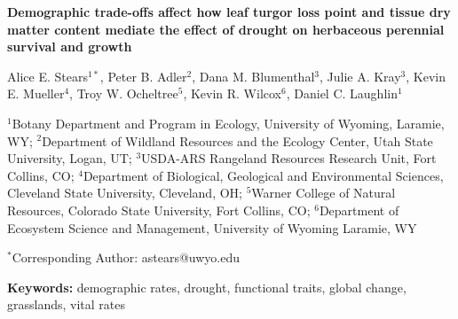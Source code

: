 \documentclass[12pt, letterpaper]{article}
\begin{document}
\begin{flushleft}
\Large{\textbf{Demographic trade-offs affect how leaf turgor loss point and tissue dry matter content mediate the effect of drought on herbaceous perennial survival and growth}} 

\normalsize{Alice E. Stears$^{1*}$, Peter B. Adler$^2$, Dana M. Blumenthal$^3$, Julie A. Kray$^3$, Kevin E. Mueller$^4$, Troy W. Ocheltree$^5$, Kevin R. Wilcox$^6$, Daniel C. Laughlin$^1$}

\small{$^1$Botany Department and Program in Ecology, University of Wyoming, Laramie, WY; \linebreak
$^2$Department of Wildland Resources and the Ecology Center, Utah State University, Logan, UT; \linebreak
$^3$USDA-ARS Rangeland Resources Research Unit, Fort Collins, CO; \linebreak
$^4$Department of Biological, Geological and Environmental Sciences, Cleveland State University, Cleveland, OH; \linebreak
$^5$Warner College of Natural Resources, Colorado State University, Fort Collins, CO; \linebreak
$^6$Department of Ecosystem Science and Management, University of Wyoming Laramie, WY}\linebreak

\small{$^*$Corresponding Author: astears@uwyo.edu}

\end{flushleft}
\textbf{Keywords:} demographic rates, drought, functional traits, global change, grasslands, vital rates
\end{document}
